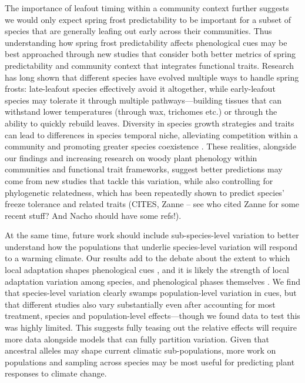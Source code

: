 \documentclass[12pt]{article}
\begin{document}
The importance of leafout timing within a community context further suggests we would only expect spring frost predictability to be important for a subset of species that are generally leafing out early across their communities. Thus understanding how spring frost predictability affects phenological cues may be best approached through new studies that consider both better metrics of spring predictability and community context that integrates functional traits. Research has long shown that different species have evolved multiple ways to handle spring frosts: late-leafout species effectively avoid it altogether, while early-leafout species may tolerate it through multiple pathways---building tissues that can withstand lower temperatures (through wax, trichomes etc.) or through the ability to quickly rebuild leaves. Diversity in species growth strategies and traits can lead to differences in species temporal niche, alleviating competition within a community and promoting greater species coexistence \citep{Fargione2005}. These realities, alongside our findings and increasing research on woody plant phenology within communities and functional trait frameworks, suggest better predictions may come from new studies that tackle this variation, while also controlling for phylogenetic relatedness, which has been repeatedly shown to predict species' freeze tolerance and related traits (CITES, Zanne -- see who cited Zanne for some recent stuff? And Nacho should have some refs!).
 
At the same time, future work should include sub-species-level variation to better understand how the populations that underlie species-level variation will respond to a warming climate. Our results add to the debate about the extent to which local adaptation shapes phenological cues \citep{Zeng2024}, and it is likely the strength of local adaptation variation among species, and phenological phases themselves \citep{Zeng2024,Savolainen2007}. We find that species-level variation clearly swamps population-level variation in cues, but that different studies also vary substantially even after accounting for most treatment, species and population-level effects---though we found data to test this was highly limited. This suggests fully teasing out the relative effects will require more data alongside models that can fully partition variation. Given that ancestral alleles may shape current climatic sub-populations, more work on populations and sampling across species may be most useful for predicting plant responses to climate change. %
\end{document}
